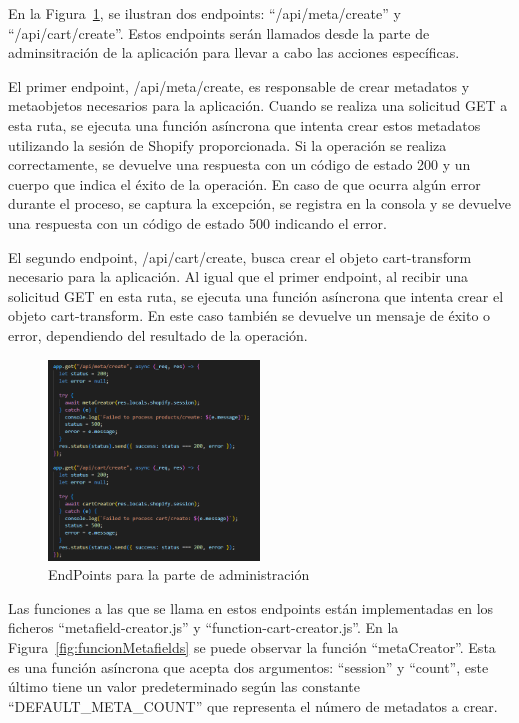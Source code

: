 \documentclass[12pt]{article}
\begin{document}
En la Figura~\ref{fig:endpointsAdmin}, se ilustran dos endpoints: ``/api/meta/create'' y ``/api/cart/create''. Estos endpoints serán
llamados desde la parte de adminsitración de la aplicación para llevar a cabo las acciones específicas.

El primer endpoint, /api/meta/create, es responsable de crear metadatos y metaobjetos necesarios para la aplicación. Cuando se realiza
una solicitud GET a esta ruta, se ejecuta una función asíncrona que intenta crear estos metadatos utilizando la sesión de Shopify proporcionada.
Si la operación se realiza correctamente, se devuelve una respuesta con un código de estado 200 y un cuerpo que indica el éxito de la operación. 
En caso de que ocurra algún error durante el proceso, se captura la excepción, se registra en la consola y se devuelve una respuesta con un código 
de estado 500 indicando el error.

El segundo endpoint, /api/cart/create, busca crear el objeto cart-transform necesario para la aplicación. Al igual que el primer endpoint, al recibir
una solicitud GET en esta ruta, se ejecuta una función asíncrona que intenta crear el objeto cart-transform. En este caso también se devuelve un 
mensaje de éxito o error, dependiendo del resultado de la operación.

\begin{figure}[ht]
    \centering
    \includegraphics[width=0.5\textwidth]{imagenes-back/EndpointsAdmin.png}
    \caption{\label{fig:endpointsAdmin} EndPoints para la parte de administración }
    \vspace{\fill}
\end{figure}

Las funciones a las que se llama en estos endpoints están implementadas en los ficheros ``metafield-creator.js'' y ``function-cart-creator.js''.
En la Figura~\ref{fig:funcionMetafields} se puede observar la función ``metaCreator''. Esta es una función asíncrona que acepta dos argumentos:
``session'' y ``count'', este último tiene un valor predeterminado según las constante ``DEFAULT\_META\_COUNT'' que representa el número de metadatos a crear.
\end{document}
